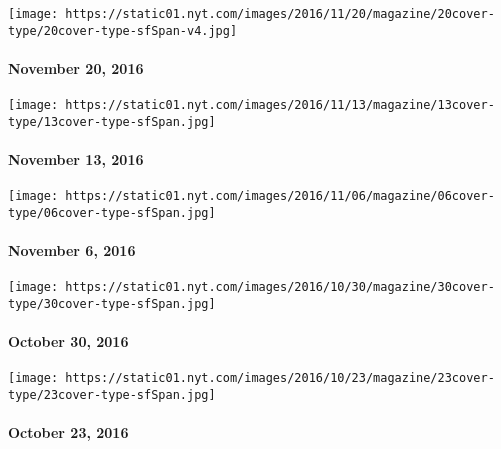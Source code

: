 \texttt{[image: https://static01.nyt.com/images/2016/11/20/magazine/20cover-type/20cover-type-sfSpan-v4.jpg]}

\hypertarget{november-20-2016}{%
\paragraph{November 20, 2016}\label{november-20-2016}}

\href{http://www.nytimes.com/indexes/2016/11/13/magazine/index.html}{}

\texttt{[image: https://static01.nyt.com/images/2016/11/13/magazine/13cover-type/13cover-type-sfSpan.jpg]}

\hypertarget{november-13-2016}{%
\paragraph{November 13, 2016}\label{november-13-2016}}

\href{http://www.nytimes.com/indexes/2016/11/06/magazine/index.html}{}

\texttt{[image: https://static01.nyt.com/images/2016/11/06/magazine/06cover-type/06cover-type-sfSpan.jpg]}

\hypertarget{november-6-2016}{%
\paragraph{November 6, 2016}\label{november-6-2016}}

\href{http://www.nytimes.com/indexes/2016/10/30/magazine/index.html}{}

\texttt{[image: https://static01.nyt.com/images/2016/10/30/magazine/30cover-type/30cover-type-sfSpan.jpg]}

\hypertarget{october-30-2016}{%
\paragraph{October 30, 2016}\label{october-30-2016}}

\href{http://www.nytimes.com/indexes/2016/10/23/magazine/index.html}{}

\texttt{[image: https://static01.nyt.com/images/2016/10/23/magazine/23cover-type/23cover-type-sfSpan.jpg]}

\hypertarget{october-23-2016}{%
\paragraph{October 23, 2016}\label{october-23-2016}}

